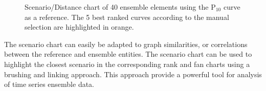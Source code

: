 \documentclass[final,5p,times,twocolumn]{elsarticle}
\begin{document}
\begin{figure}[H]
  \caption{Scenario/Distance chart of 40 ensemble elements using the P$_{10}$ curve as a reference. The 5 best ranked curves according to the manual selection are highlighted in orange.}
  \label{fig:scen-chart-40}
\end{figure}

The scenario chart can easily be adapted to graph similarities, or correlations between the reference and ensemble entities. The scenario chart can be used to highlight the closest scenario in the corresponding rank and fan charts using a brushing and linking approach. This approach provide a powerful tool for analysis of time series ensemble data.


%
%
%
%
\end{document}
